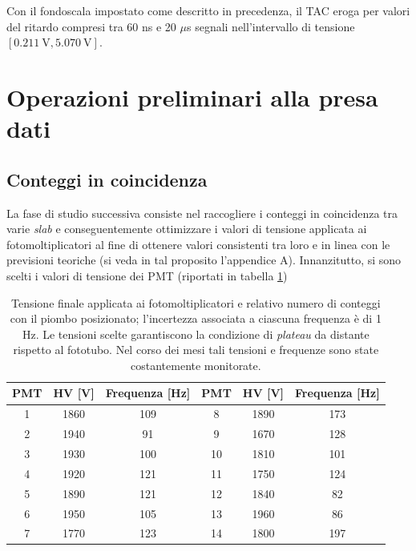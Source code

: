 \documentclass[10pt, oneside, a4paper]{article}   	%
\begin{document}
Con il fondoscala impostato come descritto in precedenza, il TAC eroga per valori del ritardo compresi tra 60 ns e 20 $\mu$s segnali nell'intervallo di tensione $[0.211 \ \mbox{V}, 5.070 \ \mbox{V}]$.
%
%
\section{Operazioni preliminari alla presa dati}
\subsection{Conteggi in coincidenza}
La fase di studio successiva consiste nel raccogliere i conteggi in coincidenza tra varie \emph{slab} e conseguentemente ottimizzare i valori di tensione applicata ai fotomoltiplicatori al fine di ottenere valori consistenti tra loro e in linea con le previsioni teoriche (si veda in tal proposito l'appendice A). 
Innanzitutto, si sono scelti i valori di tensione dei PMT (riportati in tabella \ref{HV_counts}) 
%
\begin{table}[b]
		\centering
	\begin{tabular}{ccc|ccc}
		\toprule
		PMT	&	HV [V]	&	Frequenza [Hz]	&PMT	&	HV [V]	&	Frequenza [Hz]\\	
		\midrule
		1	&	1860	&	109	&8	&	1890	&	173\\
		2	&	1940	&	91	&9	&	1670	&	128\\
		3	&	1930	&	100	&10	&	1810	&	101\\
		4	&	1920	&	121	&11	&	1750	&	124\\
		5	&	1890	&	121	&12	&	1840	&	82 \\
		6	&	1950	&	105	&13	&	1960	&	86 \\
		7	&	1770	&	123	&14	&	1800	&	197\\
		\bottomrule
	\end{tabular}
	\caption{Tensione finale applicata ai fotomoltiplicatori e relativo numero di conteggi con il piombo posizionato; l'incertezza associata a ciascuna frequenza è di 1 Hz. Le tensioni scelte garantiscono la condizione di \emph{plateau} da distante rispetto al fototubo. Nel corso dei mesi tali tensioni e frequenze sono state costantemente monitorate.}
	\label{HV_counts}
\end{table}
\end{document}
